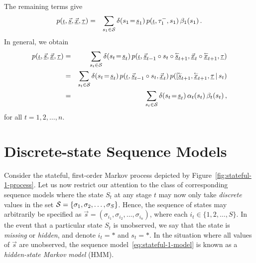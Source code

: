 \documentclass[a4paper]{article}
\newcommand{\rvec}[1]{\accentset{\leftarrow}{#1}}
\begin{document}
The remaining terms give
\begin{eqnarray}
   p(\underline{\iota},\underline{\vec{s}},\underline{\vec{x}},\underline{\tau}) 
& = & 
   \sum_{s_1\in{\cal S}}\delta(s_1\!=\!\underline{s}_1)\,p(\underline{\iota},\tau^-_1,s_1)\,\beta_1(s_1)\,.
\end{eqnarray}
In general, we obtain
\begin{eqnarray}
   p(\underline{\iota},\underline{\vec{s}},\underline{\vec{x}},\underline{\tau}) 
& = & 
   \sum_{s_t\in{\cal S}}\delta(s_t\!=\!\underline{s}_t)\,
   p(\underline{\iota},\underline{\vec{s}}_{t-1}\circ s_t\circ\underline{\rvec{s}}_{t+1},
\underline{\vec{x}}_t\circ\underline{\rvec{x}}_{t+1},\underline{\tau}) 
\nonumber\\&=&
   \sum_{s_t\in{\cal S}}\delta(s_t\!=\!\underline{s}_t)\,
p(\underline{\iota},\underline{\vec{s}}_{t-1}\circ s_t,\underline{\vec{x}}_t)
\,p([\underline{\rvec{s}}_{t+1},\underline{\rvec{x}}_{t+1},\underline{\tau}\,|\,s_{t})
\nonumber\\&=&
   \sum_{s_t\in{\cal S}}\delta(s_t\!=\!\underline{s}_t)\,\alpha_t(s_t)\,\beta_t(s_t)\,,
\end{eqnarray}
for all $t=1,2,\ldots,n$.

\section{Discrete-state Sequence Models}\label{sec:discrete-state}

Consider the stateful, first-order Markov process depicted by Figure~\ref{fig:stateful-1-process}.
Let us now restrict our attention to the class of corresponding sequence models where
the state $S_t$ at any stage $t$ may now only take {\em discrete} values in the set 
${\cal S}=\{\sigma_1,\sigma_2,\ldots,\sigma_S\}$.
Hence, the sequence of states may arbitrarily be specified as $\vec{s}=(\sigma_{i_1},\sigma_{i_2},\ldots,\sigma_{i_n})$,
where each $i_t\in\{1,2,\ldots,S\}$.
In the event that a particular state $S_t$ is unobserved, we say that the state is {\em missing} or {\em hidden},
and denote $i_t=*$ and $s_t=*$. In the situation where all values of $\vec{s}$ are unobserved,
the sequence model~\eqref{eq:stateful-1-model} is known as a {\em hidden-state Markov model} (HMM).
\end{document}
